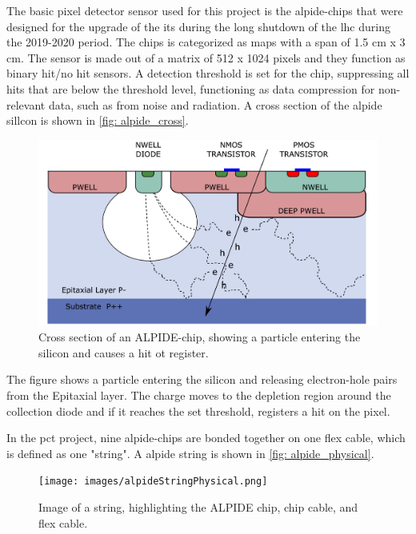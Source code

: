 \documentclass[main.tex]{subfiles}
\begin{document}
The basic pixel detector sensor used for this project is the \gls{alpide}-chips that were designed for the upgrade of the \gls{its} during the long shutdown of the \gls{lhc} during the 2019-2020 period. The chips is categorized as \gls{maps} with a span of 1.5 cm x 3 cm. The sensor is made out of a matrix of 512 x 1024 pixels and they function as binary hit/no hit sensors. A detection threshold is set for the chip, suppressing all hits that are below the threshold level, functioning as data compression for non-relevant data, such as from noise and radiation. A cross section of the \gls{alpide} sillcon is shown in \autoref{fig: alpide_cross}.

\begin{figure}[!htpb]
    \centering
    \includegraphics[width=12cm]{images/alpide_chip.jpg}
    \caption{Cross section of an ALPIDE-chip, showing a particle entering the silicon and causes a hit ot register.}
    \label{fig: alpide_cross}
\end{figure}
\FloatBarrier


The figure shows a particle entering the silicon and releasing electron-hole pairs from the Epitaxial layer. The charge moves to the depletion region around the collection diode and if it reaches the set threshold, registers a hit on the pixel.

In the \gls{pct} project, nine \gls{alpide}-chips are bonded together on one flex cable, which is defined as one "string". A \gls{alpide} string is shown in \autoref{fig: alpide_physical}.

\begin{figure}[!htpb]
    \centering
    \texttt{[image: images/alpideStringPhysical.png]}
    \caption{Image of a string, highlighting the ALPIDE chip, chip cable, and flex cable.}
    \label{fig: alpide_physical}
\end{figure}
\FloatBarrier
\end{document}
